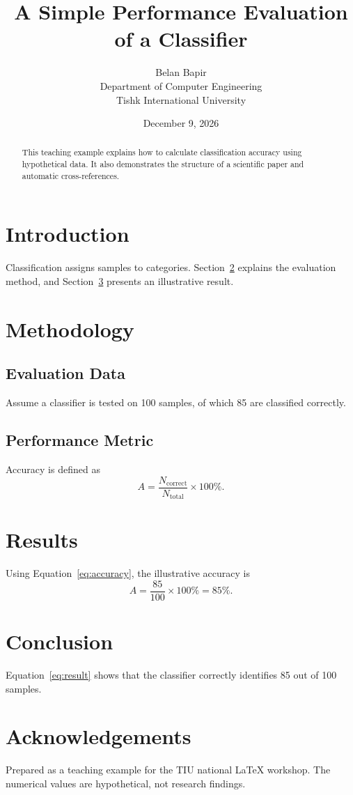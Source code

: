 \documentclass[11pt,a4paper]{article}
\title{A Simple Performance Evaluation of a Classifier}
\author{Belan Bapir\\Department of Computer Engineering\\Tishk International University}
\date{December 9, 2026}
\begin{document}
\maketitle
\begin{abstract}
This teaching example explains how to calculate classification accuracy using hypothetical data. It also demonstrates the structure of a scientific paper and automatic cross-references.
\end{abstract}
\section{Introduction}
\label{sec:intro}
Classification assigns samples to categories. Section~\ref{sec:method} explains the evaluation method, and Section~\ref{sec:results} presents an illustrative result.
\section{Methodology}
\label{sec:method}
\subsection{Evaluation Data}
Assume a classifier is tested on 100 samples, of which 85 are classified correctly.
\subsection{Performance Metric}
Accuracy is defined as
\begin{equation}
\label{eq:accuracy}
A=\frac{N_{\mathrm{correct}}}{N_{\mathrm{total}}}\times 100\% .
\end{equation}
\section{Results}
\label{sec:results}
Using Equation~\eqref{eq:accuracy}, the illustrative accuracy is
\begin{equation}
\label{eq:result}
A=\frac{85}{100}\times 100\%=85\%.
\end{equation}
\section{Conclusion}
Equation~\eqref{eq:result} shows that the classifier correctly identifies 85 out of 100 samples.
\section*{Acknowledgements}
Prepared as a teaching example for the TIU national LaTeX workshop. The numerical values are hypothetical, not research findings.
\end{document}

